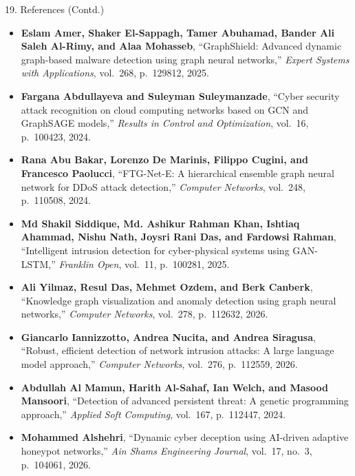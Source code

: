 \documentclass[aspectratio=169,10pt]{beamer}
\begin{document}
\begin{frame}[t]{19. References (Contd.)}
\vspace{-0.2em}
\fontsize{6.2pt}{8.0pt}\selectfont
\begin{itemize}\itemsep0.15em
  \item[\textbf{[9]}] \textbf{Eslam Amer, Shaker El-Sappagh, Tamer Abuhamad, Bander Ali Saleh Al-Rimy, and Alaa Mohasseb}, ``GraphShield: Advanced dynamic graph-based malware detection using graph neural networks,'' \textit{Expert Systems with Applications}, vol.~268, p.~129812, 2025.
  \item[\textbf{[10]}] \textbf{Fargana Abdullayeva and Suleyman Suleymanzade}, ``Cyber security attack recognition on cloud computing networks based on GCN and GraphSAGE models,'' \textit{Results in Control and Optimization}, vol.~16, p.~100423, 2024.
  \item[\textbf{[11]}] \textbf{Rana Abu Bakar, Lorenzo De Marinis, Filippo Cugini, and Francesco Paolucci}, ``FTG-Net-E: A hierarchical ensemble graph neural network for DDoS attack detection,'' \textit{Computer Networks}, vol.~248, p.~110508, 2024.
  \item[\textbf{[12]}] \textbf{Md Shakil Siddique, Md. Ashikur Rahman Khan, Ishtiaq Ahammad, Nishu Nath, Joysri Rani Das, and Fardowsi Rahman}, ``Intelligent intrusion detection for cyber-physical systems using GAN-LSTM,'' \textit{Franklin Open}, vol.~11, p.~100281, 2025.
  \item[\textbf{[13]}] \textbf{Ali Yilmaz, Resul Das, Mehmet Ozdem, and Berk Canberk}, ``Knowledge graph visualization and anomaly detection using graph neural networks,'' \textit{Computer Networks}, vol.~278, p.~112632, 2026.
  \item[\textbf{[14]}] \textbf{Giancarlo Iannizzotto, Andrea Nucita, and Andrea Siragusa}, ``Robust, efficient detection of network intrusion attacks: A large language model approach,'' \textit{Computer Networks}, vol.~276, p.~112559, 2026.
  \item[\textbf{[15]}] \textbf{Abdullah Al Mamun, Harith Al-Sahaf, Ian Welch, and Masood Mansoori}, ``Detection of advanced persistent threat: A genetic programming approach,'' \textit{Applied Soft Computing}, vol.~167, p.~112447, 2024.
  \item[\textbf{[16]}] \textbf{Mohammed Alshehri}, ``Dynamic cyber deception using AI-driven adaptive honeypot networks,'' \textit{Ain Shams Engineering Journal}, vol.~17, no.~3, p.~104061, 2026.
\end{itemize}
\end{frame}
\end{document}
